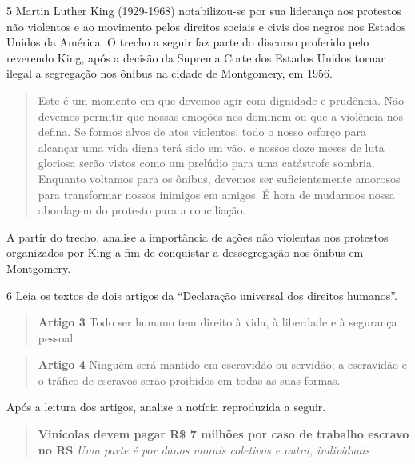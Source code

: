 \num{5} Martin Luther King (1929-1968) notabilizou-se por sua liderança
aos protestos não violentos e ao movimento pelos direitos sociais e
civis dos negros nos Estados Unidos da América. O trecho a seguir faz
parte do discurso proferido pelo reverendo King, após a decisão da
Suprema Corte dos Estados Unidos tornar ilegal a segregação nos ônibus
na cidade de Montgomery, em 1956.

\begin{quote}
Este é um momento em que devemos agir com dignidade e prudência. Não
devemos permitir que nossas emoções nos dominem ou que a violência nos
defina. Se formos alvos de atos violentos, todo o nosso esforço para
alcançar uma vida digna terá sido em vão, e nossos doze meses de luta
gloriosa serão vistos como um prelúdio para uma catástrofe sombria.
Enquanto voltamos para os ônibus, devemos ser suficientemente amorosos
para transformar nossos inimigos em amigos. É hora de mudarmos nossa
abordagem do protesto para a conciliação.
\end{quote}

A partir do trecho, analise a importância de ações não violentas nos
protestos organizados por King a fim de conquistar a dessegregação nos
ônibus em Montgomery.


\num{6} Leia os textos de dois artigos da ``Declaração universal dos
direitos humanos''.

\begin{quote}
\textbf{Artigo 3} Todo ser humano tem direito à vida, à liberdade e à
segurança pessoal.
\end{quote}

\begin{quote}
\textbf{Artigo 4} Ninguém será mantido em escravidão ou servidão; a
escravidão e o tráfico de escravos serão proibidos em todas as suas
formas.
\end{quote}

Após a leitura dos artigos, analise a notícia reproduzida a seguir.

\begin{quote}
\textbf{Vinícolas devem pagar R\$ 7 milhões por caso de trabalho escravo no RS}
\emph{Uma parte é por danos morais coletivos e outra, individuais}
\end{quote}

